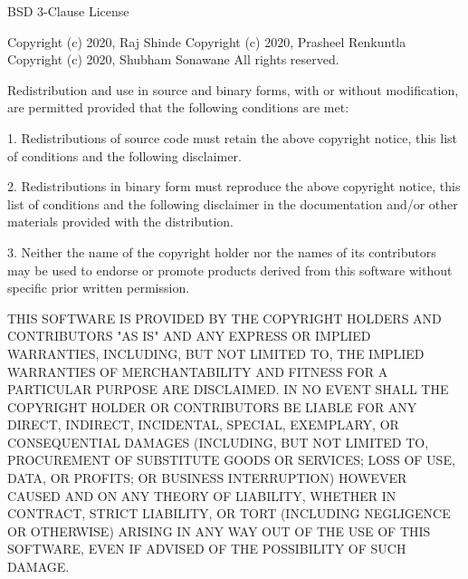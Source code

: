 \begin{DoxyCode}
BSD 3-Clause License

Copyright (c) 2020, Raj Shinde
Copyright (c) 2020, Prasheel Renkuntla
Copyright (c) 2020, Shubham Sonawane
All rights reserved.

Redistribution and use in source and binary forms, with or without
modification, are permitted provided that the following conditions are met:

1. Redistributions of source code must retain the above copyright notice, this
   list of conditions and the following disclaimer.

2. Redistributions in binary form must reproduce the above copyright notice,
   this list of conditions and the following disclaimer in the documentation
   and/or other materials provided with the distribution.

3. Neither the name of the copyright holder nor the names of its
   contributors may be used to endorse or promote products derived from
   this software without specific prior written permission.

THIS SOFTWARE IS PROVIDED BY THE COPYRIGHT HOLDERS AND CONTRIBUTORS "AS IS"
AND ANY EXPRESS OR IMPLIED WARRANTIES, INCLUDING, BUT NOT LIMITED TO, THE
IMPLIED WARRANTIES OF MERCHANTABILITY AND FITNESS FOR A PARTICULAR PURPOSE ARE
DISCLAIMED. IN NO EVENT SHALL THE COPYRIGHT HOLDER OR CONTRIBUTORS BE LIABLE
FOR ANY DIRECT, INDIRECT, INCIDENTAL, SPECIAL, EXEMPLARY, OR CONSEQUENTIAL
DAMAGES (INCLUDING, BUT NOT LIMITED TO, PROCUREMENT OF SUBSTITUTE GOODS OR
SERVICES; LOSS OF USE, DATA, OR PROFITS; OR BUSINESS INTERRUPTION) HOWEVER
CAUSED AND ON ANY THEORY OF LIABILITY, WHETHER IN CONTRACT, STRICT LIABILITY,
OR TORT (INCLUDING NEGLIGENCE OR OTHERWISE) ARISING IN ANY WAY OUT OF THE USE
OF THIS SOFTWARE, EVEN IF ADVISED OF THE POSSIBILITY OF SUCH DAMAGE.
\end{DoxyCode}
 